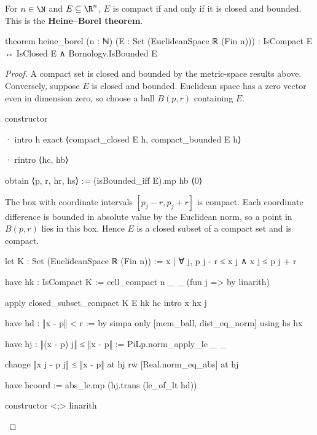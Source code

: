 \begin{theorem}
  \label{ma:thm:heine-borel-theorem}
  For $n\in\N$ and $E\subseteq\R^{n}$, $E$ is compact if and only if it is closed and bounded.
  This is the \textbf{Heine--Borel theorem}.

  \begin{lean}
    theorem heine_borel (n : ℕ) (E : Set (EuclideanSpace ℝ (Fin n))) :
        IsCompact E ↔ IsClosed E ∧ Bornology.IsBounded E
  \end{lean}
\end{theorem}

\begin{proof}
  A compact set is closed and bounded by the metric-space results above.
  Conversely, suppose $E$ is closed and bounded.
  Euclidean space has a zero vector even in dimension zero, so choose a ball $B(p,r)$ containing
  $E$.

  \begin{lean}
    constructor

    · intro h
      exact ⟨compact_closed E h, compact_bounded E h⟩

    · rintro ⟨hc, hb⟩

      obtain ⟨p, r, hr, hs⟩ := (isBounded_iff E).mp hb ⟨0⟩
  \end{lean}

  The box with coordinate intervals $[p_j-r,p_j+r]$ is compact.
  Each coordinate difference is bounded in absolute value by the Euclidean norm, so a point in
  $B(p,r)$ lies in this box.
  Hence $E$ is a closed subset of a compact set and is compact.

  \begin{lean}
    let K : Set (EuclideanSpace ℝ (Fin n)) := {x | ∀ j, p j - r ≤ x j ∧ x j ≤ p j + r}

    have hk : IsCompact K := cell_compact n _ _ (fun j => by linarith)

    apply closed_subset_compact K E hk hc
    intro x hx j

    have hd : ‖x - p‖ < r := by
      simpa only [mem_ball, dist_eq_norm] using hs hx

    have hj : ‖(x - p) j‖ ≤ ‖x - p‖ := PiLp.norm_apply_le _ _

    change ‖x j - p j‖ ≤ ‖x - p‖ at hj
    rw [Real.norm_eq_abs] at hj

    have hcoord := abs_le.mp (hj.trans (le_of_lt hd))

    constructor <;> linarith
  \end{lean}

\end{proof}
